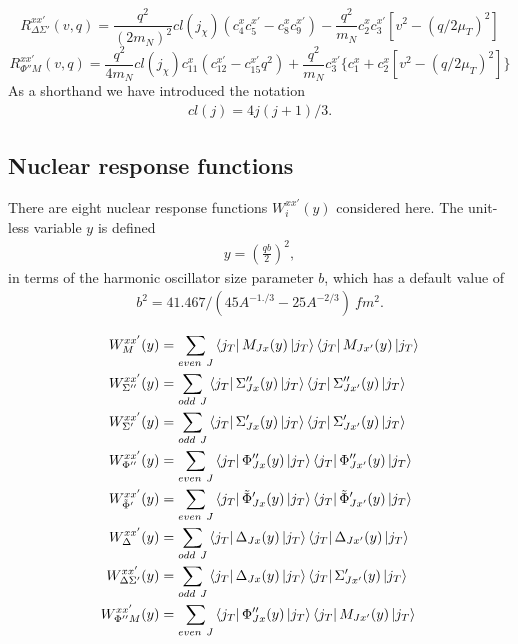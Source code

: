 \documentclass[11pt]{article}
\begin{document}
\begin{dmath}
R_{\Delta \Sigma'}^{xx'}(v,q) = \frac{q^2}{(2m_N)^2}cl(j_\chi) 
        (c_{4}^{x}c_{5}^{x'} - c_{8}^{x}c_{9}^{x'}) 
        - \frac{q^2}{m_N} c_{2}^{x}c_{3}^{x'} [v^2-(q/2\mu_T)^2]
\end{dmath}
\begin{dmath}
R_{\Phi''M}^{xx'}(v,q) = \frac{q^2}{4m_N}cl(j_\chi)c_{11}^{x}
        (c_{12}^{x'} - c_{15}^{x'} q^2) 
        + \frac{q^2}{m_N}c_{3}^{x'}  \{c_{1}^{x} + c_{2}^{x} [v^2-(q/2\mu_T)^2]\}
\end{dmath}
As a shorthand we have introduced the notation 
\begin{align}
	cl(j) = 4j(j+1)/3.
\end{align}


\subsection{Nuclear response functions}
There are eight nuclear response functions $W_i^{xx'}(y)$ considered 
here. The unit-less variable $y$ is defined 
\begin{align}
 y = \left ( \frac{qb}{2} \right) ^2,
 \end{align}
 in terms of the harmonic oscillator size parameter $b$, which has a default value of 
 \begin{align}
b^2 = 41.467/(45A^{-1./3} - 25A^{-2/3})\ fm^2.
 \end{align}

 
\begin{align}
W_M^{xx'}(y) &= \sum_{even\ J} 
\bra{j_T}M_{Jx}(y)\ket{j_T}
\bra{j_T}M_{Jx'}(y)\ket{j_T}
\\
W_{\Sigma''}^{xx'}(y) &= \sum_{odd\ J} 
\bra{j_T}{\Sigma''}_{Jx}(y)\ket{j_T}
\bra{j_T}{\Sigma''}_{Jx'}(y)\ket{j_T}
\\
W_{\Sigma'}^{xx'}(y) &= \sum_{odd\ J} 
\bra{j_T}{\Sigma'}_{Jx}(y)\ket{j_T}
\bra{j_T}{\Sigma'}_{Jx'}(y)\ket{j_T}
\\
W_{\Phi''}^{xx'}(y) &= \sum_{even\ J} 
\bra{j_T}{\Phi''}_{Jx}(y)\ket{j_T}
\bra{j_T}{\Phi''}_{Jx'}(y)\ket{j_T}
\\
W_{\tilde{\Phi}'}^{xx'}(y) &= \sum_{even\ J} 
\bra{j_T}{\tilde{\Phi}'}_{Jx}(y)\ket{j_T}
\bra{j_T}{\tilde{\Phi}'}_{Jx'}(y)\ket{j_T}
\\
W_{\Delta}^{xx'}(y) &= \sum_{odd\ J} 
\bra{j_T}{\Delta}_{Jx}(y)\ket{j_T}
\bra{j_T}{\Delta}_{Jx'}(y)\ket{j_T}
\\
W_{\Delta\Sigma'}^{xx'}(y) &= \sum_{odd\ J} 
\bra{j_T}{\Delta}_{Jx}(y)\ket{j_T}
\bra{j_T}{\Sigma'}_{Jx'}(y)\ket{j_T}
\\
W_{\Phi''M}^{xx'}(y) &= \sum_{even\ J} 
\bra{j_T}{\Phi''}_{Jx}(y)\ket{j_T}
\bra{j_T}{M}_{Jx'}(y)\ket{j_T}
\end{align}
\end{document}
